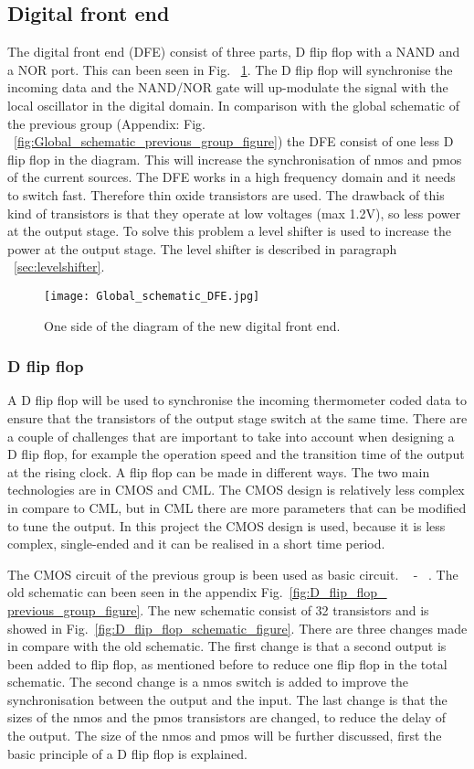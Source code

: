 \subsection{Digital front end}\label{sec:frontend}
The digital front end (DFE) consist of three parts, D flip flop with a NAND and a NOR port. This can been seen in Fig. ~\ref{fig:Global_schematic_DFE_figure}. The D flip flop will synchronise the incoming data and the NAND/NOR gate will up-modulate the signal with the local oscillator in the digital domain. In comparison with the global schematic of the previous group (Appendix: Fig. ~\ref{fig:Global_schematic_previous_group_figure}) the DFE consist of one less D flip flop in the diagram. This will increase the synchronisation of nmos and pmos of the current sources. The DFE works in a high frequency domain and it needs to switch fast. Therefore thin oxide transistors are used. The drawback of this kind of transistors is that they operate at low voltages (max 1.2V), so less power at the output stage. To solve this problem a level shifter is used to increase the power at the output stage. The level shifter is described in paragraph ~\ref{sec:levelshifter}. 

\begin{figure}[h]
\texttt{[image: Global\_schematic\_DFE.jpg]}
\caption{One side of the diagram of the new digital front end.}
\label{fig:Global_schematic_DFE_figure}
\end{figure}

\subsubsection{D flip flop}\label{sec:frontend}
A D flip flop will be used to synchronise the incoming thermometer coded data to ensure that the transistors of the output stage switch at the same time. There are a couple of challenges that are important to take into account when designing a D flip flop, for example the operation speed and the transition time of the output at the rising clock.
A flip flop can be made in different ways. The two main technologies are in CMOS and CML. The CMOS design is relatively less complex in compare to CML, but in CML there are more parameters that can be modified to tune the output. In this project the CMOS design is used, because it is less complex, single-ended and it can be realised in a short time period. 

The CMOS circuit of the previous group is been used as basic circuit. ~\cite{powerdac} - ~\cite{coursebook}. The old schematic can been seen in the appendix Fig.~\ref{fig:D_flip_flop_ previous_group_figure}. The new schematic consist of 32 transistors and is showed in Fig.~\ref{fig:D_flip_flop_schematic_figure}. There are three changes made in compare with the old schematic. The first change is that a second output is been added to flip flop, as mentioned before to reduce one flip flop in the total schematic. The second change is a nmos switch is added to improve the synchronisation between the output and the input. The last change is that the sizes of the nmos and the pmos transistors are changed, to reduce the delay of the output. The size of the nmos and pmos will be further discussed, first the basic principle of a D flip flop is explained. 

